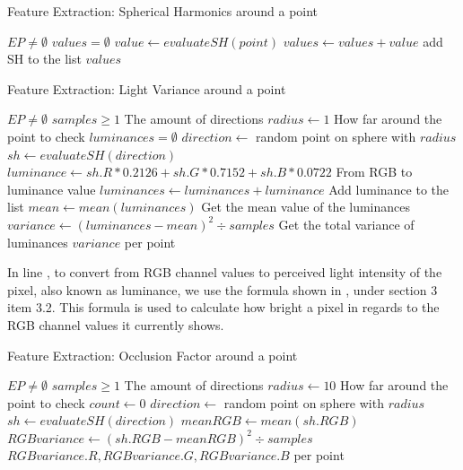 \begin{algorithm}
	\caption{Feature Extraction: Spherical Harmonics around a point}
	\label{alg:feat_sh}
	\begin{algorithmic}[1]
		\Require $EP \neq \emptyset$
		\State $values = \emptyset$
			\State $value \gets evaluateSH(point)$
			\State $values \gets values + value$ \Comment add SH to the list
		\EndFor
		\State \Return $values$
	\end{algorithmic}
\end{algorithm}

\begin{algorithm}
	\caption{Feature Extraction: Light Variance around a point}
	\label{alg:feat_lv}
	\begin{algorithmic}[1]
		\Require $EP \neq \emptyset$
		\Require $samples \geq 1$ \Comment The amount of directions
		\State $radius \gets 1$ \Comment How far around the point to check
			\State $luminances = \emptyset$
				\State $direction \gets$ random point on sphere with $radius$
				\State $sh \gets evaluateSH(direction)$
				\State $luminance \gets sh.R * 0.2126 + sh.G * 0.7152 + sh.B * 0.0722$ \Comment From RGB to luminance value
				\label{alg:feat_lv:7}
				\State $luminances \gets luminances + luminance$ \Comment Add luminance to the list
			\EndFor
			\State $mean \gets mean(luminances)$ \Comment Get the mean value of the luminances
			\State $variance \gets (luminances - mean)^2 \div samples$ \Comment Get the total variance of luminances
		\EndFor
		\State \Return $variance$ per point
	\end{algorithmic}
\end{algorithm}

In line , to convert from RGB channel values to perceived light intensity of the pixel, also known as luminance, we use the formula shown in \cite{Luminance2015}, under section 3 item 3.2. This formula is used to calculate how bright a pixel in regards to the RGB channel values it currently shows.

\begin{algorithm}
	\caption{Feature Extraction: Occlusion Factor around a point}
	\label{alg:feat_rgbv}
	\begin{algorithmic}[1]
		\Require $EP \neq \emptyset$
		\Require $samples \geq 1$ \Comment The amount of directions
		\State $radius \gets 10$ \Comment How far around the point to check
		\State $count \gets 0$
		\State $direction \gets$ random point on sphere with $radius$
		\State $sh \gets evaluateSH(direction)$
		\EndFor
		\State $meanRGB \gets mean(sh.RGB)$
		\State $RGBvariance \gets (sh.RGB - meanRGB)^2 \div samples$
		\EndFor
		\State \Return ${RGBvariance.R, RGBvariance.G, RGBvariance.B}$ per point
	\end{algorithmic}
\end{algorithm}


